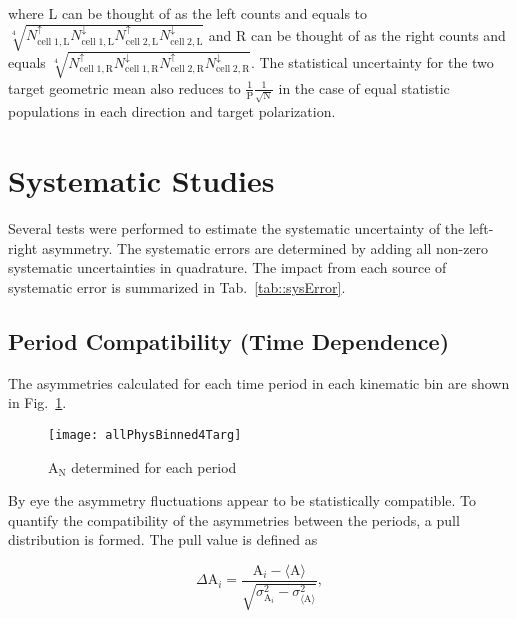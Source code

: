 \noindent
where L can be thought of as the left counts and equals to
$\sqrt[4]{N_{\mathrm{cell\;1,L}}^{\uparrow}N_{\mathrm{cell\;1,
      L}}^{\downarrow}N_{\mathrm{cell\;2,L}}^{\uparrow}N_{\mathrm{cell\;2,
      L}}^{\downarrow}}$ and R can be thought of as the right counts and equals
$\sqrt[4]{N_{\mathrm{cell\;1,R}}^{\uparrow}N_{\mathrm{cell\;1,
      R}}^{\downarrow}N_{\mathrm{cell\;2,R}}^{\uparrow}N_{\mathrm{cell\;2,
      R}}^{\downarrow}}$.  The statistical uncertainty for the two target
geometric mean also reduces to $\frac{1}{\mathrm{P}}\frac{1}{\sqrt{\mathrm{N}}}$
in the case of equal statistic populations in each direction and target
polarization.


\section{Systematic Studies} \label{sec::systematics}
Several tests were performed to estimate the systematic uncertainty of the
left-right asymmetry.  The systematic errors are determined by adding all
non-zero systematic uncertainties in quadrature.  The impact from each source of
systematic error is summarized in Tab.~\ref{tab::sysError}.

\subsection{Period Compatibility (Time Dependence)}
The asymmetries calculated for each time period in each kinematic bin are shown
in Fig.~\ref{fig::allPhysBinned4Targ}.

\begin{figure}[h!t]
  \begin{center}
    \texttt{[image: allPhysBinned4Targ]}
    \caption{A$_{\mathrm{N}}$ determined for each period}
    \label{fig::allPhysBinned4Targ}
  \end{center}
\end{figure}

\noindent
By eye the asymmetry fluctuations appear to be statistically compatible.  To
quantify the compatibility of the asymmetries between the periods, a pull
distribution is formed.  The pull value is defined as

\begin{equation}
  \label{eq::pull}
  \Delta\mathrm{A}_i =
  \frac{
    \mathrm{A}_i - \langle \mathrm{A} \rangle
  }{
    \sqrt{
      \sigma^2_{\mathrm{A}_i} - \sigma^2_{\langle \mathrm{A} \rangle}
    }
  },
\end{equation}

